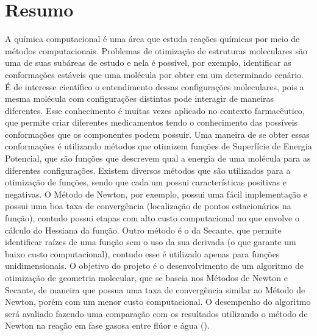 \section{Resumo}

A química computacional é uma área que estuda reações químicas por meio de
métodos computacionais. Problemas de otimização de estruturas moleculares são uma de suas
subáreas de estudo e nela é possível, por exemplo, identificar as conformações estáveis que
uma molécula por obter em um determinado cenário. É de interesse científico o entendimento
dessas configurações moleculares, pois a mesma molécula com configurações distintas pode
interagir de maneiras diferentes. Esse conhecimento é muitas vezes aplicado no contexto
farmacêutico, que permite criar diferentes medicamentos tendo o conhecimento das possíveis
conformações que os componentes podem possuir. Uma maneira de se obter essas
conformações é utilizando métodos que otimizem funções de Superfície de Energia Potencial,
que são funções que descrevem qual a energia de uma molécula para as diferentes
configurações. Existem diversos métodos que são utilizados para a otimização de funções,
sendo que cada um possui características positivas e negativas. O Método de Newton, por
exemplo, possui uma fácil implementação e possui uma boa taxa de convergência
(localização de pontos estacionários na função), contudo possui etapas com alto custo
computacional no que envolve o cálculo do Hessiana da função. Outro método é o da
Secante, que permite identificar raízes de uma função sem o uso da sua derivada (o que
garante um baixo custo computacional), contudo esse é utilizado apenas para funções
unidimensionais. O objetivo do projeto é o desenvolvimento de um algoritmo de otimização
de geometria molecular, que se baseia nos Métodos de Newton e Secante, de maneira que
possua uma taxa de convergência similar ao Método de Newton, porém com um menor custo
computacional. O desempenho do algoritmo será avaliado fazendo uma comparação com os
resultados utilizando o método de Newton na reação em fase gasosa entre flúor e água
().
